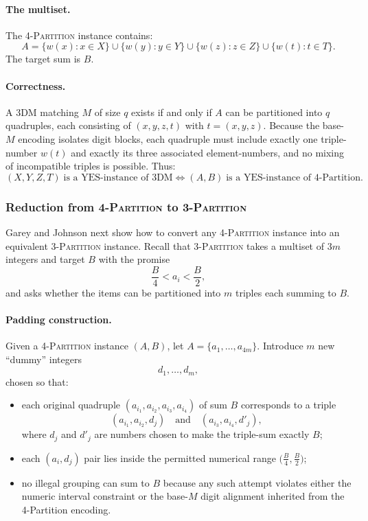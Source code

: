 \documentclass[9pt]{extarticle}
\begin{document}
\paragraph{The multiset.}
The \textsc{4-Partition} instance contains:
\[
A = \{w(x) : x\in X\} \cup \{w(y): y\in Y\} \cup \{w(z): z\in Z\}
      \cup \{w(t) : t\in T\}.
\]
The target sum is $B$.

\paragraph{Correctness.}
A 3DM matching $M$ of size $q$ exists if and only if $A$ can be partitioned
into $q$ quadruples, each consisting of $(x,y,z,t)$ with $t=(x,y,z)$.
Because the base-$M$ encoding isolates digit blocks, each quadruple must include
exactly one triple-number $w(t)$ and exactly its three associated
element-numbers, and no mixing of incompatible triples is possible.  
Thus:
\[
(X,Y,Z,T)\;\text{is a YES-instance of 3DM} 
\iff
(A,B)\;\text{is a YES-instance of 4-Partition}.
\]

\subsubsection*{Reduction from \textsc{4-Partition} to \textsc{3-Partition}}

Garey and Johnson next show how to convert any \textsc{4-Partition} instance
into an equivalent \textsc{3-Partition} instance.  
Recall that \textsc{3-Partition} takes a multiset of $3m$ integers and target
$B$ with the promise
\[
\frac{B}{4} < a_i < \frac{B}{2},
\]
and asks whether the items can be partitioned into $m$ triples each summing to
$B$.

\paragraph{Padding construction.}
Given a \textsc{4-Partition} instance $(A,B)$, let $A = \{a_1,\dots,a_{4m}\}$.  
Introduce $m$ new ``dummy'' integers
\[
d_1,\dots,d_m,
\]
chosen so that:
\begin{itemize}
    \item each original quadruple $(a_{i_1},a_{i_2},a_{i_3},a_{i_4})$ of sum $B$
          corresponds to a triple
          \[
          (a_{i_1}, a_{i_2}, d_j)
          \quad\text{and}\quad
          (a_{i_3}, a_{i_4}, d'_j),
          \]
          where $d_j$ and $d'_j$ are numbers chosen to make the triple-sum
          exactly $B$;
    \item each $(a_i,d_j)$ pair lies inside the permitted numerical range
          $\bigl(\frac{B}{4},\frac{B}{2}\bigr)$;
    \item no illegal grouping can sum to $B$ because any such attempt violates
          either the numeric interval constraint or the base-$M$ digit
          alignment inherited from the 4-Partition encoding.
\end{itemize}
\end{document}
